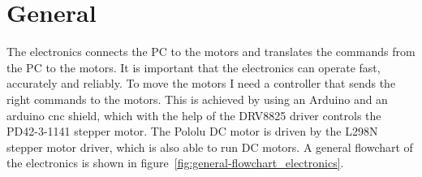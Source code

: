 \section{General}\label{sec:general2}
The electronics connects the PC to the motors and translates the commands from the PC to the motors.
It is important that the electronics can operate fast, accurately and reliably.
To move the motors I need a controller that sends the right commands to the motors.
This is achieved by using an Arduino\autocite{arduino} and an arduino cnc shield\autocite{cnc-shield}, which with the help of the DRV8825\autocite{drv8825} driver controls the PD42-3-1141 stepper motor.
The Pololu DC motor is driven by the L298N\autocite{l298n} stepper motor driver, which is also able to run DC motors.
A general flowchart of the electronics is shown in figure~\ref{fig:general-flowchart_electronics}.

